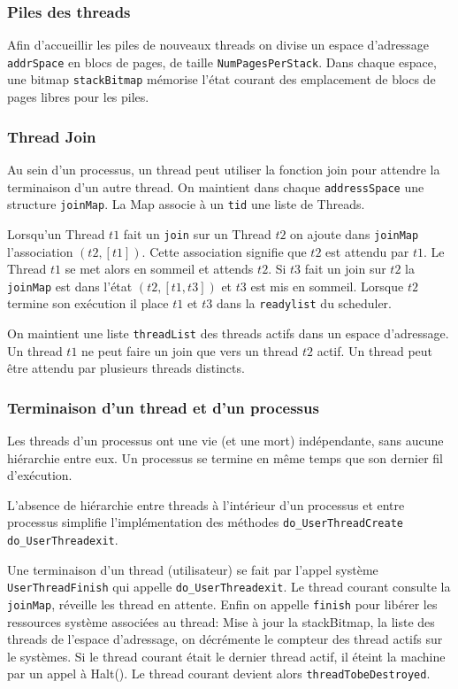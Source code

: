 \documentclass[11pt]{article}
\begin{document}
\subsubsection{Piles des threads}
Afin d'accueillir les piles de nouveaux threads on divise un espace d'adressage \texttt{addrSpace}
en blocs de pages, de taille \texttt{NumPagesPerStack}.
Dans chaque espace, une bitmap \texttt{stackBitmap} mémorise l'état courant des emplacement de blocs de
pages libres pour les piles.

\subsubsection{Thread Join}
Au sein d'un processus, un thread peut utiliser la fonction join pour attendre la terminaison d'un autre thread.
On maintient dans chaque \texttt{addressSpace} une structure \texttt{joinMap}.
La Map associe à un \texttt{tid} une liste de Threads.

Lorsqu'un Thread $t1$ fait un \texttt{join} sur un Thread $t2$ on ajoute dans \texttt{joinMap}
l'association $(t2, [t1])$. Cette association signifie que $t2$ est attendu par $t1$.
Le Thread $t1$ se met alors en sommeil et attends $t2$. 
Si $t3$ fait un join sur $t2$ la \texttt{joinMap} est dans l'état $(t2, [t1,t3])$ et $t3$ est mis en sommeil.
Lorsque $t2$ termine son exécution il place $t1$ et $t3$ dans la \texttt{readylist} du scheduler.

On maintient une liste \texttt{threadList} des threads actifs dans un espace d'adressage.
Un thread $t1$ ne peut faire un join que vers un thread $t2$ actif.
Un thread peut être attendu par plusieurs threads distincts.


\subsubsection{Terminaison d'un thread et d'un processus}
Les threads d'un processus ont une vie (et une mort) indépendante, sans aucune hiérarchie entre eux.
Un processus se termine en même temps que son dernier fil d'exécution.

L'absence de hiérarchie entre threads à l'intérieur d'un processus et entre processus simplifie
l'implémentation des méthodes \texttt{do\_UserThreadCreate} \texttt{do\_UserThreadexit}.

Une terminaison d'un thread (utilisateur) se fait par l'appel système \texttt{UserThreadFinish} qui appelle \texttt{do\_UserThreadexit}. Le thread courant consulte la \texttt{joinMap}, réveille les thread en attente. Enfin on appelle \texttt{finish} pour libérer les ressources système associées au thread:
Mise à jour la stackBitmap, la liste des threads de l'espace d'adressage, on décrémente le compteur des
thread actifs sur le systèmes. Si le thread courant était le dernier thread actif, il éteint la machine par un appel à Halt(). Le thread courant devient alors \texttt{threadTobeDestroyed}.
\end{document}
